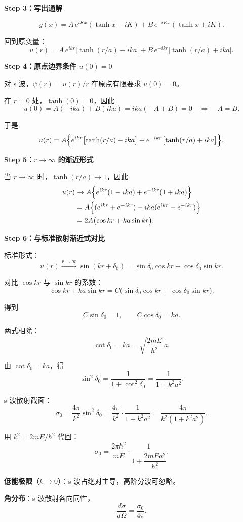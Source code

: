 \begin{derivationbox}[边界条件与系数确定]
\textbf{Step 3：写出通解}

\[
y(x) = A\,e^{iKx}(\tanh x - iK) + B\,e^{-iKx}(\tanh x + iK).
\]

回到原变量：
\[
u(r) = A\,e^{ikr}\bigl[\tanh(r/a) - ika\bigr] + B\,e^{-ikr}\bigl[\tanh(r/a) + ika\bigr].
\]

\textbf{Step 4：原点边界条件 $u(0)=0$}

对 s 波，$\psi(r) = u(r)/r$ 在原点有限要求 $u(0)=0$。

在 $r=0$ 处，$\tanh(0)=0$，因此
\[
u(0) = A(-ika) + B(ika) = ika(-A+B) = 0\quad\Rightarrow\quad A = B.
\]

于是
\[
u(r) = A\Bigl\{e^{ikr}\bigl[\tanh(r/a) - ika\bigr] + e^{-ikr}\bigl[\tanh(r/a) + ika\bigr]\Bigr\}.
\]
\end{derivationbox}

\begin{derivationbox}[渐近行为与相移提取]
\textbf{Step 5：$r\to\infty$ 的渐近形式}

当 $r\to\infty$ 时，$\tanh(r/a)\to 1$，因此
\begin{align*}
u(r) &\to A\Bigl\{e^{ikr}(1-ika) + e^{-ikr}(1+ika)\Bigr\}\\
&= A\Bigl\{(e^{ikr}+e^{-ikr}) - ika(e^{ikr}-e^{-ikr})\Bigr\}\\
&= 2A\bigl(\cos kr + ka\sin kr\bigr).
\end{align*}

\textbf{Step 6：与标准散射渐近式对比}

标准形式：
\[
u(r) \xrightarrow{r\to\infty} \sin(kr+\delta_0) = \sin\delta_0\cos kr + \cos\delta_0\sin kr.
\]

对比 $\cos kr$ 与 $\sin kr$ 的系数：
\[
\cos kr + ka\sin kr = C\bigl(\sin\delta_0\cos kr + \cos\delta_0\sin kr\bigr).
\]

得到
\[
C\sin\delta_0 = 1,\qquad C\cos\delta_0 = ka.
\]

两式相除：
\[
\boxed{\cot\delta_0 = ka = \sqrt{\frac{2mE}{\hbar^2}}\,a}.
\]
\end{derivationbox}

\begin{formulabox}[散射截面与角分布]
由 $\cot\delta_0 = ka$，得
\[
\sin^2\delta_0 = \frac{1}{1+\cot^2\delta_0} = \frac{1}{1+k^2a^2}.
\]

s 波散射截面：
\[
\sigma_0 = \frac{4\pi}{k^2}\sin^2\delta_0 = \frac{4\pi}{k^2}\cdot\frac{1}{1+k^2a^2}
= \frac{4\pi}{k^2(1+k^2a^2)}.
\]

用 $k^2 = 2mE/\hbar^2$ 代回：
\[
\boxed{\sigma_0 = \frac{2\pi\hbar^2}{mE}\cdot\frac{1}{1+\dfrac{2mEa^2}{\hbar^2}}}.
\]

\textbf{低能极限}（$k\to 0$）：s 波占绝对主导，高阶分波可忽略。

\textbf{角分布}：s 波散射各向同性，
\[
\boxed{\frac{d\sigma}{d\Omega} = \frac{\sigma_0}{4\pi}}.
\]
\end{formulabox}

